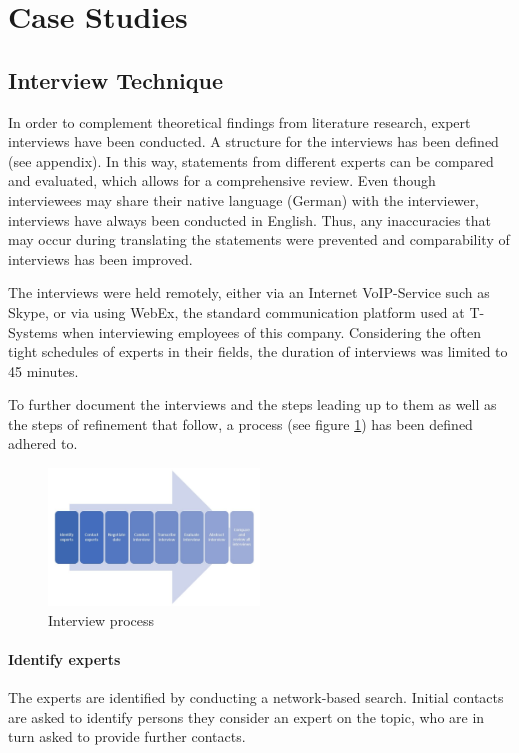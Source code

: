 
\section{Case Studies}

\subsection{Interview Technique}
In order to complement theoretical findings from literature research, expert interviews have been conducted. A structure for the interviews has been defined (see appendix). In this way, statements from different experts can be compared and evaluated, which allows for a comprehensive review. Even though interviewees may share their native language (German) with the interviewer, interviews have always been conducted in English. Thus, any inaccuracies that may occur during translating the statements were prevented and comparability of interviews has been improved.

The interviews were held remotely, either via an Internet VoIP-Service such as Skype, or via using WebEx, the standard communication platform used at T-Systems when interviewing employees of this company. Considering the often tight schedules of experts in their fields, the duration of interviews was limited to 45 minutes.

To further document the interviews and the steps leading up to them as well as the steps of refinement that follow, a process (see figure \ref{fig:Intprocess}) has been defined adhered to. 

\begin{figure}[htb]
	\centering
	\includegraphics[width=0.5\textwidth]{Pictures/Interview_process}
	\caption{Interview process}
	\label{fig:Intprocess}
\end{figure}

\paragraph{Identify experts} The experts are identified by conducting a network-based search. Initial contacts are asked to identify persons they consider an expert on the topic, who are in turn asked to provide further contacts.
